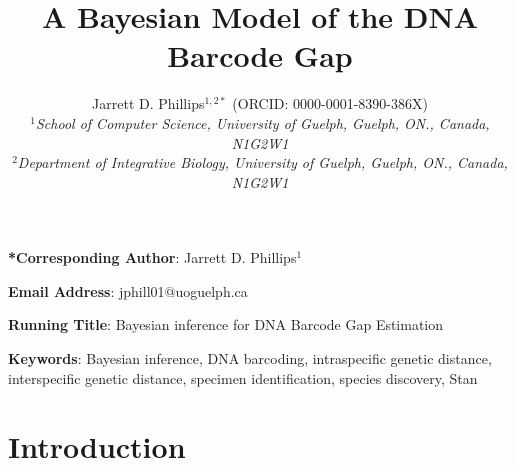 \documentclass[12pt]{article}
\makeatletter
\renewcommand{\maketitle}{\bgroup\setlength{\parindent}{0pt}
\begin{flushleft}
\textbf{\@title}

  \@author
\end{flushleft}\egroup
}
\makeatother
\begin{document}
\linenumbers

\title{A Bayesian Model of the DNA Barcode Gap}

\author{Jarrett D. Phillips$^{1, 2*}$ (ORCID: 0000-0001-8390-386X)  \\
\textit{$^1$School of Computer Science, University of Guelph, Guelph, ON., Canada, N1G2W1} \\ \textit{$^2$Department of Integrative Biology, University of Guelph, Guelph, ON., Canada, N1G2W1} }

\date{}

\maketitle

\vspace{2mm}

\noindent \textbf{*Corresponding Author}: Jarrett D. Phillips$^{1}$

\noindent \textbf{Email Address}: jphill01@uoguelph.ca

\noindent \textbf{Running Title}: Bayesian inference for DNA Barcode Gap Estimation

\newpage

\begin{abstract}

\end{abstract}

\textbf{Keywords}: Bayesian inference, DNA barcoding, intraspecific genetic distance, \\ interspecific genetic distance, specimen identification, species discovery, Stan 

\vspace{2mm}

\section{Introduction}
\end{document}

